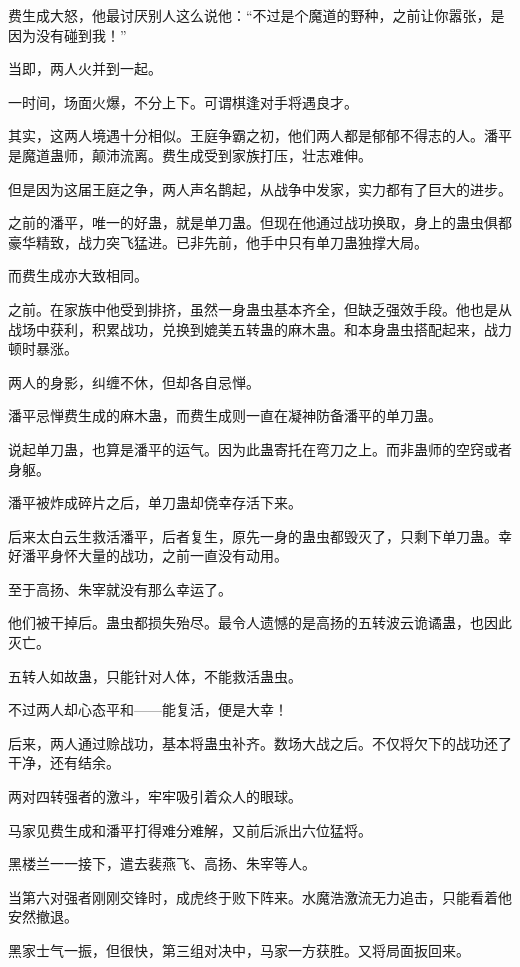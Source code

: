 \begin{this_body}
费生成大怒，他最讨厌别人这么说他：“不过是个魔道的野种，之前让你嚣张，是因为没有碰到我！”

当即，两人火并到一起。

一时间，场面火爆，不分上下。可谓棋逢对手将遇良才。

其实，这两人境遇十分相似。王庭争霸之初，他们两人都是郁郁不得志的人。潘平是魔道蛊师，颠沛流离。费生成受到家族打压，壮志难伸。

但是因为这届王庭之争，两人声名鹊起，从战争中发家，实力都有了巨大的进步。

之前的潘平，唯一的好蛊，就是单刀蛊。但现在他通过战功换取，身上的蛊虫俱都豪华精致，战力突飞猛进。已非先前，他手中只有单刀蛊独撑大局。

而费生成亦大致相同。

之前。在家族中他受到排挤，虽然一身蛊虫基本齐全，但缺乏强效手段。他也是从战场中获利，积累战功，兑换到媲美五转蛊的麻木蛊。和本身蛊虫搭配起来，战力顿时暴涨。

两人的身影，纠缠不休，但却各自忌惮。

潘平忌惮费生成的麻木蛊，而费生成则一直在凝神防备潘平的单刀蛊。

说起单刀蛊，也算是潘平的运气。因为此蛊寄托在弯刀之上。而非蛊师的空窍或者身躯。

潘平被炸成碎片之后，单刀蛊却侥幸存活下来。

后来太白云生救活潘平，后者复生，原先一身的蛊虫都毁灭了，只剩下单刀蛊。幸好潘平身怀大量的战功，之前一直没有动用。

至于高扬、朱宰就没有那么幸运了。

他们被干掉后。蛊虫都损失殆尽。最令人遗憾的是高扬的五转波云诡谲蛊，也因此灭亡。

五转人如故蛊，只能针对人体，不能救活蛊虫。

不过两人却心态平和——能复活，便是大幸！

后来，两人通过赊战功，基本将蛊虫补齐。数场大战之后。不仅将欠下的战功还了干净，还有结余。

两对四转强者的激斗，牢牢吸引着众人的眼球。

马家见费生成和潘平打得难分难解，又前后派出六位猛将。

黑楼兰一一接下，遣去裴燕飞、高扬、朱宰等人。

当第六对强者刚刚交锋时，成虎终于败下阵来。水魔浩激流无力追击，只能看着他安然撤退。

黑家士气一振，但很快，第三组对决中，马家一方获胜。又将局面扳回来。


\end{this_body}
